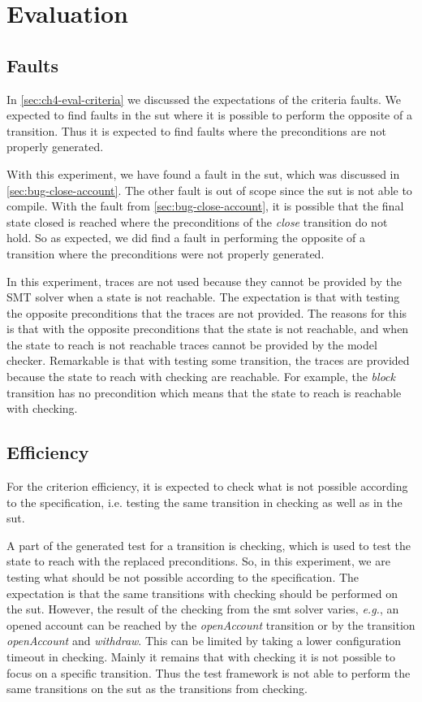 \section{Evaluation}\label{sec:ch4-evaluation}

\subsection{Faults}
In \autoref{sec:ch4-eval-criteria} we discussed the expectations of the criteria
faults. We expected to find faults in the \gls{sut} where it is possible to perform
the opposite of a transition. Thus it is expected to find faults where the
preconditions are not properly generated.

With this experiment, we have found a fault in the \gls{sut}, which was
discussed in \autoref{sec:bug-close-account}. The other fault is out of scope
since the \gls{sut} is not able to compile. With the fault from
\autoref{sec:bug-close-account}, it is possible that the final state closed is
reached where the preconditions of the \textit{close} transition do not hold.
So as expected, we did find a fault in performing the opposite of a transition
where the preconditions were not properly generated.

In this experiment, traces are not used because they cannot be provided by the
\gls{SMT} solver when a state is not reachable. The expectation is that with
testing the opposite preconditions that the traces are not provided.
The reasons for this is that with the opposite preconditions that the state is
not reachable, and when the state to reach is not reachable traces cannot be
provided by the model checker.
Remarkable is that with testing some transition, the traces are provided
because the state to reach with checking are reachable. For example, the
\textit{block} transition has no precondition which means that the state to
reach is reachable with checking.

\subsection{Efficiency}
For the criterion efficiency, it is expected to check what is not possible
according to the specification, i.e. testing the same transition in checking as
well as in the \gls{sut}.

A part of the generated test for a transition is checking, which is used to test
the state to reach with the replaced preconditions. So, in this experiment, we
are testing what should be not possible according to the
specification. The expectation is that the same transitions with checking should
be performed on the \gls{sut}. However, the result of the checking from the
\gls{smt} solver varies, \textit{e.g.}, an opened account can be reached by the
\textit{openAccount} transition or by the transition \textit{openAccount} and
\textit{withdraw}. This can be limited by taking a lower configuration timeout
in checking. Mainly it remains that with checking it is not possible to focus on
a specific transition. Thus the test framework is not able to perform the same
transitions on the \gls{sut} as the transitions from checking.

